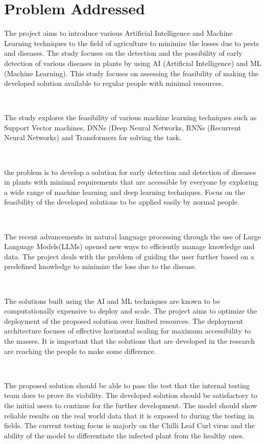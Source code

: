 \section{Problem Addressed}

The project aims to introduce various Artificial Intelligence and Machine Learning techniques to the field of agriculture to minimize the losses due to pests and diseases. The study focuses on the detection and the possibility of early detection of various diseases in plants by using AI (Artificial Intelligence) and ML (Machine Learning). This study focuses on assessing the feasibility of making the developed solution available to regular people with minimal resources.

\

The study explores the feasibility of various machine learning techniques such as Support Vector machines, DNNs (Deep Neural Networks, RNNs (Recurrent Neural Networks) and Transformers for solving the task.

\

the problem is to develop a solution for early detection and detection of diseases in plants with minimal requirements that are accessible by everyone by exploring a wide range of machine learning and deep learning techniques. Focus on the feasibility of the developed solutions to be applied easily by normal people.

\

The recent advancements in natural language processing through the use of Large Language Models(LLMs) opened new ways to efficiently manage knowledge and data. The project deals with the problem of guiding the user further based on a predefined knowledge to minimize the loss due to the disease.

\

The solutions built using the AI and ML techniques are known to be computationally expensive to deploy and scale. The project aims to optimize the deployment of the proposed solution over limited resources. The deployment architecture focuses of effective horizontal scaling for maximum accessibility to the masses. It is important that the solutions that are developed in the research are reaching the people to make some difference. 

\

The proposed solution should be able to pass the test that the internal testing team does to prove its viability. The developed solution should be satisfactory to the initial users to continue for the further development. The model should show reliable results on the real world data that it is exposed to during the testing in fields. The current testing focus is majorly on the Chilli Leaf Curl virus and the ability of the model to differentiate the infected plant from the healthy ones. 

